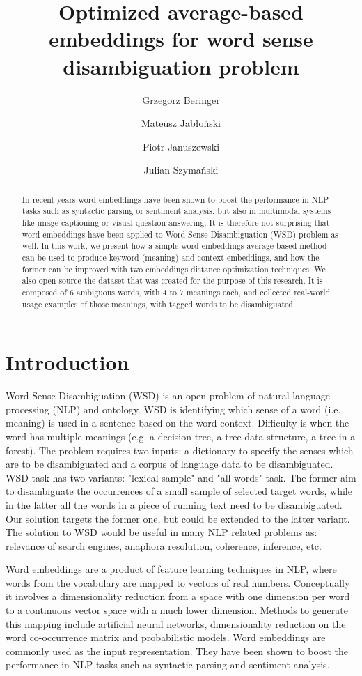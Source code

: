 \documentclass{llncs}
\title{Optimized average-based embeddings for word sense disambiguation problem}
\author{Grzegorz Beringer \and Mateusz Jabłoński \and Piotr Januszewski \and Julian Szymański}
\institute{
Faculty of Electronic Telecommunications and Informatics\\
Gda{\'n}sk University of Technology, Gda{\'n}sk, Poland
}
\begin{document}
\maketitle
\begin{abstract}

In recent years word embeddings have been shown to boost the performance in NLP tasks such as syntactic parsing or sentiment analysis, but also in multimodal systems like image captioning or visual question answering.
It is therefore not surprising that word embeddings have been applied to Word Sense Disambiguation (WSD) problem as well.
In this work, we present how a simple word embeddings average-based method can be used to produce keyword (meaning) and context embeddings, and how the former can be improved with two embeddings distance optimization techniques.
We also open source the dataset that was created for the purpose of this research.
It is composed of 6 ambiguous words, with 4 to 7 meanings each, and collected real-world usage examples of those meanings, with tagged words to be disambiguated.

\end{abstract}

\section{Introduction}
\label{introduction}

Word Sense Disambiguation (WSD) is an open problem of natural language processing (NLP) and ontology. WSD is identifying which sense of a word (i.e. meaning) is used in a sentence based on the word context. Difficulty is when the word has multiple meanings (e.g. a decision tree, a tree data structure, a tree in a forest). The problem requires two inputs: a dictionary to specify the senses which are to be disambiguated and a corpus of language data to be disambiguated. WSD task has two variants: "lexical sample" and "all words" task. The former aim to disambiguate the occurrences of a small sample of selected target words, while in the latter all the words in a piece of running text need to be disambiguated. Our solution targets the former one, but could be extended to the latter variant.
The solution to WSD would be useful in many NLP related problems as: relevance of search engines, anaphora resolution, coherence, inference, etc.

Word embeddings are a product of feature learning techniques in NLP, where words from the vocabulary are mapped to vectors of real numbers. Conceptually it involves a dimensionality reduction from a space with one dimension per word to a continuous vector space with a much lower dimension.
Methods to generate this mapping include artificial neural networks\cite{word2vec}\cite{GloVe}\cite{fastText}, dimensionality reduction on the word co-occurrence matrix\cite{Levy2014NWE} and probabilistic models\cite{Globerson2007EEC}.
Word embeddings are commonly used as the input representation. They have been shown to boost the performance in NLP tasks such as syntactic parsing\cite{parsingGrammars} and sentiment analysis\cite{sentimentAnalysis}.
\end{document}
